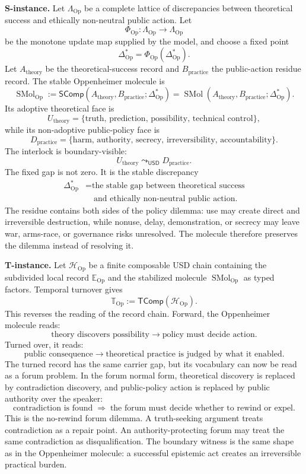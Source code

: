 \documentclass[11pt]{article}
\newcommand{\USD}{\mathsf{USD}}
\newcommand{\defeq}{\mathrel{:=}}
\newcommand{\uconn}{\mathrel{\leadsto_{\USD}}}
\newcommand{\SComp}{\mathsf{SComp}}
\newcommand{\TComp}{\mathsf{TComp}}
\theoremstyle{definition}
\theoremstyle{plain}
\begin{document}
\textbf{S-instance.}  Let $\Lambda_{\mathrm{Op}}$ be a complete lattice
of discrepancies between theoretical success and ethically non-neutral
public action.  Let
\[
  \Phi_{\mathrm{Op}}:
  \Lambda_{\mathrm{Op}}\to\Lambda_{\mathrm{Op}}
\]
be the monotone update map supplied by the model, and choose a fixed
point
\[
  \Delta_{\mathrm{Op}}^*
  =
  \Phi_{\mathrm{Op}}(\Delta_{\mathrm{Op}}^*).
\]
Let $A_{\mathrm{theory}}$ be the theoretical-success record and
$B_{\mathrm{practice}}$ the public-action residue record.  The stable
Oppenheimer molecule is
\[
  \operatorname{SMol}_{\mathrm{Op}}
  \defeq
  \SComp(A_{\mathrm{theory}},B_{\mathrm{practice}};
   \Delta_{\mathrm{Op}}^*)
  =
  \operatorname{SMol}
  (A_{\mathrm{theory}},B_{\mathrm{practice}};
   \Delta_{\mathrm{Op}}^*).
\]
Its adoptive theoretical face is
\[
  U_{\mathrm{theory}}
  =
  \{\text{truth, prediction, possibility, technical control}\},
\]
while its non-adoptive public-policy face is
\[
  D_{\mathrm{practice}}
  =
  \{\text{harm, authority, secrecy, irreversibility,
    accountability}\}.
\]
The interlock is boundary-visible:
\[
  U_{\mathrm{theory}}
  \uconn
  D_{\mathrm{practice}}.
\]
The fixed gap is not zero.  It is the stable discrepancy
\[
\begin{aligned}
  \Delta_{\mathrm{Op}}^*
  &=
  \text{the stable gap between theoretical success}\\
  &\quad\text{and ethically non-neutral public action}.
\end{aligned}
\]
The residue contains both sides of the policy dilemma: use may create
direct and irreversible destruction, while nonuse, delay, demonstration,
or secrecy may leave war, arms-race, or governance risks unresolved.
The molecule therefore preserves the dilemma instead of resolving it.

\textbf{T-instance.}  Let $\mathcal H_{\mathrm{Op}}$ be a finite
composable USD chain containing the subdivided local record
$\mathbb E_{\mathrm{Op}}$ and the stabilized molecule
$\operatorname{SMol}_{\mathrm{Op}}$ as typed factors.  Temporal turnover
gives
\[
  \mathbb T_{\mathrm{Op}}
  \defeq
  \TComp(\mathcal H_{\mathrm{Op}}).
\]
This reverses the reading of the record chain.
Forward, the Oppenheimer molecule reads:
\[
  \text{theory discovers possibility}
  \longrightarrow
  \text{policy must decide action}.
\]
Turned over, it reads:
\[
  \text{public consequence}
  \longrightarrow
  \text{theoretical practice is judged by what it enabled}.
\]
The turned record has the same carrier gap, but its vocabulary can now be
read as a forum problem.  In the forum normal form, theoretical discovery
is replaced by contradiction discovery, and public-policy action is
replaced by public authority over the speaker:
\[
  \text{contradiction is found}
  \;\Longrightarrow\;
  \text{the forum must decide whether to rewind or expel}.
\]
This is the no-rewind forum dilemma.  A truth-seeking argument treats
contradiction as a repair point.  An authority-protecting forum may treat
the same contradiction as disqualification.  The boundary witness is the
same shape as in the Oppenheimer molecule: a successful epistemic act
creates an irreversible practical burden.
\end{document}
